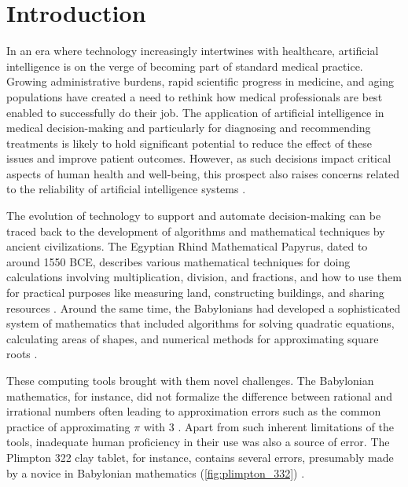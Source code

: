 
\chapter[introduction]{Introduction}\label{chp:introduction}
%
%

In an era where technology increasingly intertwines with healthcare, artificial intelligence is on the verge of becoming part of standard medical practice. 
Growing administrative burdens, rapid scientific progress in medicine, and aging populations have created a need to rethink how medical professionals are best enabled to successfully do their job. 
The application of artificial intelligence in medical decision-making and particularly for diagnosing and recommending treatments is likely to hold significant potential to reduce the effect of these issues and improve patient outcomes. 
However, as such decisions impact critical aspects of human health and well-being, this prospect also raises concerns related to the reliability of artificial intelligence systems \parencite{chen_ethical_2021, shailaja_machine_2018, ahmad_interpretable_2018}.

The evolution of technology to support and automate decision-making can be traced back to the development of algorithms and mathematical techniques by ancient civilizations. 
The Egyptian Rhind Mathematical Papyrus, dated to around 1550 BCE, describes various mathematical techniques for doing calculations involving multiplication, division, and fractions, and how to use them for practical purposes like measuring land, constructing buildings, and sharing resources \parencite{georges_universal_2001}. 
Around the same time, the Babylonians had developed a sophisticated system of mathematics that included algorithms for solving quadratic equations, calculating areas of shapes, and numerical methods for approximating square roots \parencite{fowler_square_1998}. 

These computing tools brought with them novel challenges. The Babylonian mathematics, for instance, did not formalize the difference between rational and irrational numbers often leading to approximation errors such as the common practice of approximating $\pi$ with 3 \parencite{georges_universal_2001}. Apart from such inherent limitations of the tools, inadequate human proficiency in their use was also a source of error. The Plimpton 322 clay tablet, for instance, contains several errors, presumably made by a novice in Babylonian mathematics (\cref{fig:plimpton_332}) \parencite{neugebauer_mathematical_1945,britton_plimpton_2011}. 

